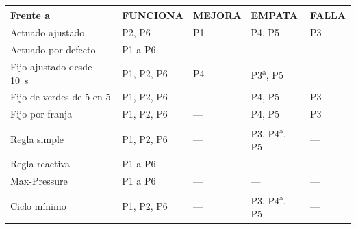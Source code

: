 \begin{tabular}{>{\raggedright\arraybackslash}p{4.2cm}>{\raggedright\arraybackslash}p{3.0cm}>{\raggedright\arraybackslash}p{1.8cm}>{\raggedright\arraybackslash}p{3.0cm}>{\raggedright\arraybackslash}p{1.8cm}}
\toprule
Frente a & FUNCIONA & MEJORA & EMPATA & FALLA \\
\midrule
Actuado ajustado & P2, P6 & P1 & P4, P5 & P3 \\
Actuado por defecto & P1 a P6 & --- & --- & --- \\
Fijo ajustado desde 10~s & P1, P2, P6 & P4 & P3\textsuperscript{a}, P5 & --- \\
Fijo de verdes de 5 en 5 & P1, P2, P6 & --- & P4, P5 & P3 \\
Fijo por franja & P1, P2, P6 & --- & P4, P5 & P3 \\
Regla simple & P1, P2, P6 & --- & P3, P4\textsuperscript{a}, P5 & --- \\
Regla reactiva & P1 a P6 & --- & --- & --- \\
Max-Pressure & P1 a P6 & --- & --- & --- \\
Ciclo mínimo & P1, P2, P6 & --- & P3, P4\textsuperscript{a}, P5 & --- \\
\bottomrule
\end{tabular}
